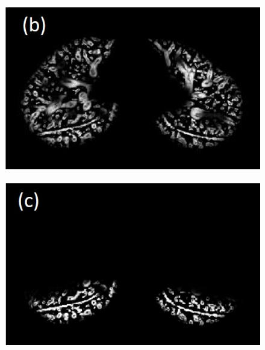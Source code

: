 \documentclass[]{spie}  %
\begin{document}
{\begin{figure}[htbp]
\begin{subfigure}
{\begin{minipage}[t]{0.288\linewidth}
  \includegraphics[width=\linewidth,trim={{.0\wd0} {.0\wd0} {.0\wd0} {.0\wd0}},clip]{Image/FissureDetection2.jpg}
  \centerline{}
	\label{fig:FissureDetection-b}
	\end{minipage}%
   }%
\end{subfigure}
\begin{subfigure}{
  \begin{minipage}[t]{0.288\linewidth}
  \includegraphics[width=\linewidth,trim={{.0\wd0} {.0\wd0} {.0\wd0} {.0\wd0}},clip]{Image/FissureDetection3.jpg}

\end{minipage}}
\end{subfigure}
\end{figure}}
\end{document}
